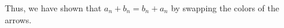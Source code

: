 \documentclass[preview]{standalone}
\begin{document}
\begin{center}
Thus, we have shown that $a_n + b_n = b_n + a_n$ by swapping the colors of the arrows.
\end{center}
\end{document}
